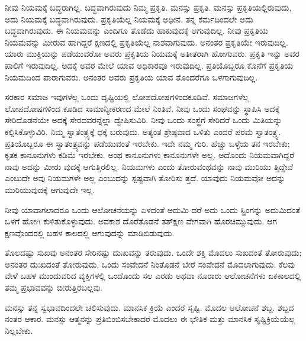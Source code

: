 ನೀವು ನಿಯಮಕ್ಕೆ ಬದ್ಧರಾಗಿಲ್ಲ. ಬದ್ಧವಾಗಿರುವುದು ನಿಮ್ಮ ಪ್ರಕೃತಿ. ಮನಸ್ಸು ಪ್ರಕೃತಿ. ಮನಸ್ಸು ಪ್ರಕೃತಿಯಲ್ಲಿರುವುದು, ಅದು ನಿಯಮಕ್ಕೆ ಬದ್ಧವಾಗಿರುವುದು. ಪ್ರಕೃತಿಯೆಲ್ಲ ನಿಯಮಕ್ಕೆ ಅಧೀನ. ತನ್ನ ಕರ್ಮದಿಂದಲೇ ಅದು ಬದ್ಧವಾಗಿರುವುದು. ಈ ನಿಯಮವನ್ನು ಎಂದಿಗೂ ತೊಡೆದು ಹಾಕುವುದಕ್ಕೆ ಆಗುವುದಿಲ್ಲ. ನೀವು ಪ್ರಕೃತಿಯ ನಿಯಮವನ್ನು ಮೀರುವ ಹಾಗಿದ್ದರೆ ಕ್ಷಣದಲ್ಲಿ ಪ್ರಕೃತಿಯೆಲ್ಲ ನಾಶವಾಗುವುದು. ಅನಂತರ ಪ್ರಕೃತಿಯೇ ಇರುವುದಿಲ್ಲ. ಯಾರು ಮುಕ್ತಿಯನ್ನು ಪಡೆಯುವರೋ ಅವರು ಪ್ರಕೃತಿಯ ನಿಯಮಕ್ಕೆ ಅತೀತರಾಗಿ ಹೋಗುವರು. ಪ್ರಕೃತಿ ಇನ್ನು ಅವರ ಪಾಲಿಗೆ ಇರುವುದಿಲ್ಲ. ಅದಕ್ಕೆ ಅವರ ಮೇಲೆ ಯಾವ ಅಧಿಕಾರವೂ ಇರುವುದಿಲ್ಲ. ಪ್ರತಿಯೊಬ್ಬರೂ ಕೊನೆಗೆ ಪ್ರಕೃತಿಯ ನಿಯಮದಿಂದ ಪಾರಾಗುವರು. ಅನಂತರ ಅವರು ಪ್ರಕೃತಿಯ ಯಾವ ತೊಂದರೆಗೂ ಒಳಗಾಗುವುದಿಲ್ಲ.

ಸರಕಾರ ಸಮಾಜ ಇವುಗಳೆಲ್ಲ ಒಂದು ದೃಷ್ಟಿಯಲ್ಲಿ ಲೋಪದೋಷಗಳಿಂದಕೂಡಿವೆ. ಸಮಾಜಗಳೆಲ್ಲ ಲೋಪದೋಷಗಳಿಂದ ಕೂಡಿದ ಸಾಮಾನ್ಯೀಕರಣದ ಮೇಲೆ ನಿಂತಿವೆ. ನೀವು ಒಂದು ಸಂಘವನ್ನು ಸ್ಥಾಪಿಸಿ ಅದಕ್ಕೆ ಸೇರಿದೊಡನೆಯೇ ಅದಕ್ಕೆ ಸೇರದವರನ್ನೆಲ್ಲಾ ದ್ವೇಷಿಸುವಿರಿ. ನೀವು ಒಂದು ಸಂಸ್ಥೆಗೆ ಸೇರಿದರೆ ಒಂದು ಮಿತಿಯನ್ನು ಕಲ್ಪಿಸಿಕೊಳ್ಳುವಿರಿ. ನಿಮ್ಮ ಸ್ವಾತಂತ್ರ್ಯಕ್ಕೆ ಧಕ್ಕೆ ಬರುವುದು. ಅತ್ಯಂತ ಶ್ರೇಷ್ಠವಾದ ಒಳಿತು ಎಂದರೆ ಪರಮ ಸ್ವಾತಂತ್ರ್ಯ. ಪ್ರತಿಯೊಬ್ಬರೂ ಈ ಸ್ವಾತಂತ್ರ್ಯವನ್ನು ಪಡೆಯುವಂತೆ ಇರಬೇಕು. ಇದೇ ನಮ್ಮ ಗುರಿ. ಹೆಚ್ಚು ಒಳ್ಳೆಯ ತನ ಇರಬೇಕು; ಕೃತಕ ಕಾನೂನುಗಳು ಕಡಿಮೆ ಇರಬೇಕು. ಅಂಥ ಕಾನೂನುಗಳು ಕಾನೂನುಗಳೇ ಅಲ್ಲ. ಅದೊಂದು ನಿಯಮವಾಗಿದ್ದರೆ ನಾವು ಅದನ್ನು ಮೀರು ವುದಕ್ಕೆ ಆಗುತ್ತಿರಲಿಲ್ಲ. ನಿಯಮಗಳು ಎಂದು ತೋರುವಂಥವನ್ನು ನಾವು ಮುರಿಯು ತ್ತಿದ್ದೇವೆ ಎಂಬುದೇ ಅವು ನಿಯಮಗಳೇ ಅಲ್ಲ ಎಂಬುದನ್ನು ಸ್ಪಷ್ಟವಾಗಿ ತೋರಿಸು ತ್ತದೆ. ಯಾವುದು ನಿಯಮವೋ ಅದನ್ನು ಮುರಿಯುವುದಕ್ಕೆ ಆಗುವುದೇ ಇಲ್ಲ.

ನೀವು ಯಾವಾಗಲಾದರೂ ಒಂದು ಆಲೋಚನೆಯನ್ನು ಏಳದಂತೆ ಅದುಮಿ ದರೆ ಅದು ಒಂದು ಸ್ಪ್ರಿಂಗನ್ನು ಅದುಮಿದಂತೆ ಒಳಗೆ ಹೋಗಿ ಕುಳಿತುಕೊಳ್ಳುವುದು. ಅವಕಾಶ ದೊರೆತೊಡನೆ ತತ್​ಕ್ಷಣ ವೇಗವಾಗಿ ಹೊರಚಿಮ್ಮುವುದು. ಆಗ ಕ್ಷಣವೊಂದರಲ್ಲಿ ಬಹಳ ಕಾಲದಲ್ಲಿ ಆಗುವುದನ್ನು ಮಾಡಿಬಿಡುವುದು.

ತೊಲದಷ್ಟು ಸುಖವು ಅನಂತರ ಸೇರಿನಷ್ಟು ದುಃಖವನ್ನು ತರುವುದು. ಒಂದೇ ಶಕ್ತಿ ಮೊದಲು ಸುಖದಂತೆ ತೋರುವುದು; ಅನಂತರ ದುಃಖದಂತೆ ತೋರುವುದು. ಒಂದು ಸಂವೇದನೆ ನಿಂತೊಡನೆ ಬೇರೆ ಸಂವೇದನೆ ಮೊದಲಾಗುವುದು. ಕೆಲವು ವೇಳೆ ಬಹಳ ಮುಂದುವರಿದ ವ್ಯಕ್ತಿಗಳಲ್ಲಿ ಒಂದೊಂದು ಸಲ ಎರಡು ಅಥವಾ ನೂರಾರು ಆಲೋಚನೆಗಳು ಏಕಕಾಲದಲ್ಲಿ ತಮ್ಮ ಪ್ರಭಾವವನ್ನು ಬೀರುತ್ತಿರಬಲ್ಲವು.

ಮನಸ್ಸು ತನ್ನ ಸ್ವಭಾವದಿಂದಲೇ ಚಲಿಸುವುದು. ಮಾನಸಿಕ ಕ್ರಿಯೆ ಎಂದರೆ ಸೃಷ್ಟಿ. ಮೊದಲ ಆಲೋಚನೆ ಶಬ್ದ. ಶಬ್ದದ ನಂತರ ಆಕಾರ. ಮನಸ್ಸು ಆತ್ಮನನ್ನು ಪ್ರತಿಬಿಂಬಿಸಬೇಕಾದರೆ ಮೊದಲು ಈ ಭೌತಿಕ ಮತ್ತು ಮಾನಸಿಕ ಸೃಷ್ಟಿಕ್ರಿಯೆಯೆಲ್ಲ ನಿಲ್ಲಬೇಕು.

